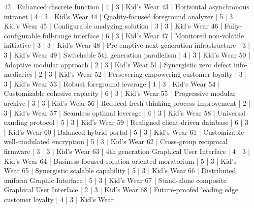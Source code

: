 \begin{enumerate}
\begin{pseudo*}
      42 | Enhanced discrete function                       |        4 |      3 | Kid's Wear    
      43 | Horizontal asynchronous intranet                 |        4 |      3 | Kid's Wear    
      44 | Quality-focused foreground analyzer              |        5 |      3 | Kid's Wear    
      45 | Configurable analyzing solution                  |        3 |      3 | Kid's Wear    
      46 | Fully-configurable full-range interface          |        6 |      3 | Kid's Wear    
      47 | Monitored non-volatile initiative                |        3 |      3 | Kid's Wear    
      48 | Pre-emptive next generation infrastructure       |        3 |      3 | Kid's Wear    
      49 | Switchable 5th generation parallelism            |        4 |      3 | Kid's Wear    
      50 | Adaptive modular approach                        |        2 |      3 | Kid's Wear    
      51 | Synergistic zero defect info-mediaries           |        2 |      3 | Kid's Wear    
      52 | Persevering empowering customer loyalty          |        3 |      3 | Kid's Wear    
      53 | Robust foreground leverage                       |        1 |      3 | Kid's Wear    
      54 | Customizable cohesive capacity                   |        6 |      3 | Kid's Wear    
      55 | Progressive modular archive                      |        3 |      3 | Kid's Wear    
      56 | Reduced fresh-thinking process improvement       |        2 |      3 | Kid's Wear    
      57 | Seamless optimal leverage                        |        6 |      3 | Kid's Wear    
      58 | Universal exuding protocol                       |        5 |      3 | Kid's Wear    
      59 | Realigned client-driven database                 |        6 |      3 | Kid's Wear    
      60 | Balanced hybrid portal                           |        5 |      3 | Kid's Wear    
      61 | Customizable well-modulated encryption           |        5 |      3 | Kid's Wear    
      62 | Cross-group reciprocal firmware                  |        3 |      3 | Kid's Wear    
      63 | 4th generation Graphical User Interface          |        4 |      3 | Kid's Wear    
      64 | Business-focused solution-oriented moratorium    |        5 |      3 | Kid's Wear    
      65 | Synergistic scalable capability                  |        5 |      3 | Kid's Wear    
      66 | Distributed uniform Graphic Interface            |        5 |      3 | Kid's Wear    
      67 | Stand-alone composite Graphical User Interface   |        2 |      3 | Kid's Wear    
      68 | Future-proofed leading edge customer loyalty     |        4 |      3 | Kid's Wear    

\end{pseudo*}
\end{enumerate}
